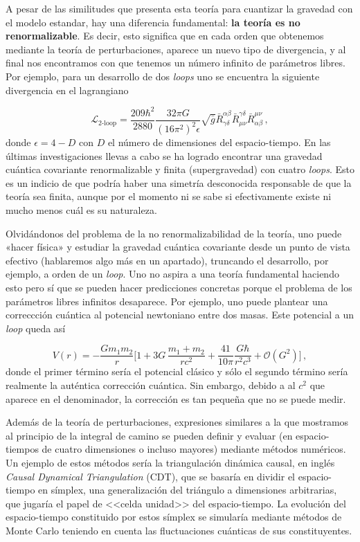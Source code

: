 \documentclass[11pt,a4paper,titlepage]{article}
\begin{document}
A pesar de las similitudes que presenta esta teoría para cuantizar la gravedad con el modelo estandar, hay una diferencia fundamental: \textbf{la teoría es no renormalizable}. Es decir, esto significa que en cada orden que obtenemos mediante la teoría de perturbaciones, aparece un nuevo tipo de divergencia, y al final nos encontramos con que tenemos un número infinito de parámetros libres. Por ejemplo, para un desarrollo de dos \emph{loops} uno se encuentra la siguiente divergencia en el lagrangiano

\begin{equation*}
 \mathscr{L}_\text{2-loop}=\frac{209\hbar^2}{2880}\frac{32\pi G}{(16\pi^2)^2\epsilon}\sqrt{\bar{g}}\bar{R}^{\alpha\beta}_{\gamma\delta}\bar{R}^{\gamma\delta}_{\mu\nu}\bar{R}^{\mu\nu}_{\alpha\beta}\,,
\end{equation*}
donde $\epsilon=4-D$ con $D$ el número de dimensiones del espacio-tiempo. En las últimas investigaciones llevas a cabo \cite{bern} se ha logrado encontrar una gravedad cuántica covariante renormalizable y finita (supergravedad) con cuatro \emph{loops}. Esto es un indicio de que podría haber una simetría desconocida responsable de que la teoría sea finita, aunque por el momento ni se sabe si efectivamente existe ni mucho menos cuál es su naturaleza.

Olvidándonos del problema de la no renormalizabilidad de la teoría, uno puede «hacer física» y estudiar la gravedad cuántica covariante desde un punto de vista efectivo (hablaremos algo más en un apartado), truncando el desarrollo, por ejemplo, a orden de un \emph{loop}. Uno no aspira a una teoría fundamental haciendo esto pero sí que se pueden hacer predicciones concretas porque el problema de los parámetros libres infinitos desaparece. Por ejemplo, uno puede plantear una correccción cuántica al potencial newtoniano entre dos masas. Este potencial a un \emph{loop} queda así

\begin{equation*}
 V(r)=-\frac{Gm_1m_2}{r}\Bigg[1+3G\,\frac{m_1+m_2}{rc^2}+\frac{41}{10\pi}\frac{G\hbar}{r^2c^3}+\mathcal{O}(G^2)\Bigg]\,,
\end{equation*}
donde el primer término sería el potencial clásico y sólo el segundo término sería realmente la auténtica corrección cuántica. Sin embargo, debido a al $c^2$ que aparece en el denominador, la corrección es tan pequeña que no se puede medir.

Además de la teoría de perturbaciones, expresiones similares a la que mostramos al principio de la integral de camino se pueden definir y evaluar (en espacio-tiempos de cuatro dimensiones o incluso mayores) mediante métodos numéricos. Un ejemplo de estos métodos sería la triangulación dinámica causal, en inglés \emph{Causal Dynamical Triangulation} (CDT), que se basaría en dividir el espacio-tiempo en símplex, una generalización del triángulo a dimensiones arbitrarias, que jugaría el papel de <<celda unidad>> del espacio-tiempo. La evolución del espacio-tiempo constituido por estos símplex se simularía mediante métodos de Monte Carlo teniendo en cuenta las fluctuaciones cuánticas de sus constituyentes.
%
%
%
%
\newpage
\end{document}
